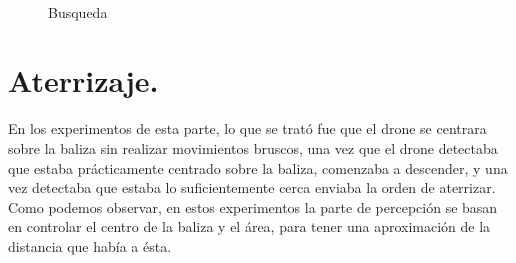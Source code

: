 \begin{figure}[H]
 \centering
	\\
 \caption{Busqueda}
 \label{f:Busqueda sobre el simulador}
\end{figure}


\section{Aterrizaje. }

\hspace{1cm} En los experimentos de esta parte, lo que se trat\'o fue que el drone se centrara sobre la baliza sin realizar movimientos bruscos, una vez que el drone detectaba que estaba pr\'acticamente centrado sobre la baliza, comenzaba a descender, y una vez detectaba que estaba lo suficientemente cerca enviaba la orden de aterrizar. Como podemos observar, en estos experimentos la parte de percepci\'on se basan en controlar el centro de la baliza y el \'area, para tener una aproximaci\'on de la distancia que hab\'ia a \'esta. 


